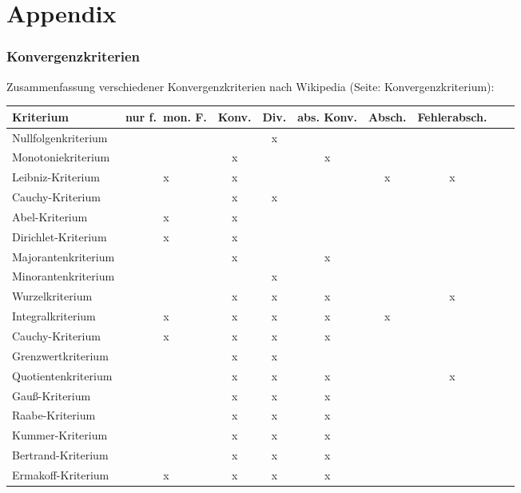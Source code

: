 \documentclass[10pt]{article}
\begin{document}
    \pagebreak
    \part{Appendix}
    \section{Konvergenzkriterien}
    Zusammenfassung verschiedener Konvergenzkriterien nach Wikipedia (Seite: Konvergenzkriterium):
    \begin{center}
        \begin{tabular}{lcccccccp{2cm}}
             \toprule
             Kriterium & {nur f.\ mon. F.} & Konv. & Div. & abs. Konv. & Absch. & Fehlerabsch.\\
             \midrule
             Nullfolgenkriterium &  &  & x &  &  & \\
             Monotoniekriterium &  & x &  & x &  & \\
             Leibniz-Kriterium & x & x &  &  & x & x\\
             Cauchy-Kriterium &  & x & x &  &  & \\
             Abel-Kriterium & x & x &  &  &  & \\
             Dirichlet-Kriterium & x & x &  &  &  & \\
             Majorantenkriterium &  & x &  & x &  & \\
             Minorantenkriterium &  &  & x &  &  & \\
             Wurzelkriterium &  & x & x & x &  & x\\
             Integralkriterium & x & x & x & x & x & \\
             Cauchy-Kriterium & x & x & x & x &  & \\
             Grenzwertkriterium &  & x & x &  &  & \\
             Quotientenkriterium &  & x & x & x &  & x\\
             Gauß-Kriterium &  & x & x & x &  & \\
             Raabe-Kriterium &  & x & x & x &  & \\
             Kummer-Kriterium &  & x & x & x &  & \\
             Bertrand-Kriterium &  & x & x & x &  & \\
             Ermakoff-Kriterium & x & x & x & x &  & \\
             \bottomrule
        \end{tabular}
    \end{center}
\end{document}

